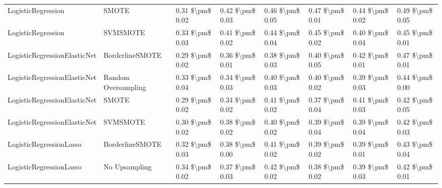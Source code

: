 \begin{tabular}{llllllll}
             LogisticRegression &                         SMOTE & 0.31 \$\textbackslash pm\$ 0.02 &           0.42 \$\textbackslash pm\$ 0.03 &       0.46 \$\textbackslash pm\$ 0.05 &        0.47 \$\textbackslash pm\$ 0.01 &                         0.44 \$\textbackslash pm\$ 0.02 &     0.49 \$\textbackslash pm\$ 0.05 \\
             LogisticRegression &                      SVMSMOTE & 0.33 \$\textbackslash pm\$ 0.03 &           0.41 \$\textbackslash pm\$ 0.02 &       0.44 \$\textbackslash pm\$ 0.04 &        0.45 \$\textbackslash pm\$ 0.02 &                         0.40 \$\textbackslash pm\$ 0.04 &     0.45 \$\textbackslash pm\$ 0.01 \\
   LogisticRegressionElasticNet &               BorderlineSMOTE & 0.29 \$\textbackslash pm\$ 0.02 &           0.36 \$\textbackslash pm\$ 0.01 &       0.38 \$\textbackslash pm\$ 0.03 &        0.40 \$\textbackslash pm\$ 0.05 &                         0.42 \$\textbackslash pm\$ 0.01 &     0.47 \$\textbackslash pm\$ 0.01 \\
   LogisticRegressionElasticNet &           Random Oversampling & 0.33 \$\textbackslash pm\$ 0.04 &           0.34 \$\textbackslash pm\$ 0.03 &       0.40 \$\textbackslash pm\$ 0.03 &        0.40 \$\textbackslash pm\$ 0.02 &                         0.39 \$\textbackslash pm\$ 0.03 &     0.44 \$\textbackslash pm\$ 0.00 \\
   LogisticRegressionElasticNet &                         SMOTE & 0.29 \$\textbackslash pm\$ 0.02 &           0.34 \$\textbackslash pm\$ 0.02 &       0.41 \$\textbackslash pm\$ 0.02 &        0.37 \$\textbackslash pm\$ 0.04 &                         0.41 \$\textbackslash pm\$ 0.03 &     0.42 \$\textbackslash pm\$ 0.05 \\
   LogisticRegressionElasticNet &                      SVMSMOTE & 0.30 \$\textbackslash pm\$ 0.02 &           0.38 \$\textbackslash pm\$ 0.02 &       0.40 \$\textbackslash pm\$ 0.02 &        0.39 \$\textbackslash pm\$ 0.04 &                         0.39 \$\textbackslash pm\$ 0.04 &     0.42 \$\textbackslash pm\$ 0.03 \\
        LogisticRegressionLasso &               BorderlineSMOTE & 0.32 \$\textbackslash pm\$ 0.03 &           0.38 \$\textbackslash pm\$ 0.00 &       0.41 \$\textbackslash pm\$ 0.02 &        0.39 \$\textbackslash pm\$ 0.02 &                         0.39 \$\textbackslash pm\$ 0.01 &     0.43 \$\textbackslash pm\$ 0.04 \\
        LogisticRegressionLasso &                 No Upsampling & 0.34 \$\textbackslash pm\$ 0.02 &           0.37 \$\textbackslash pm\$ 0.03 &       0.42 \$\textbackslash pm\$ 0.02 &        0.38 \$\textbackslash pm\$ 0.02 &                         0.39 \$\textbackslash pm\$ 0.03 &     0.42 \$\textbackslash pm\$ 0.01 \\

\end{tabular}
